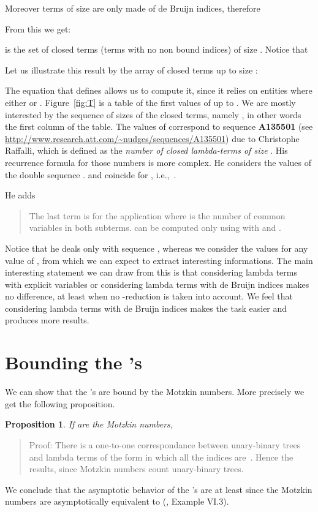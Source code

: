 \documentclass[preprint,authoryear]{elsarticle}
\newenvironment{proof}[1]{\begin{quotation}\noindent\textsf{Proof:} #1}{\end{quotation}}
\newtheorem{prop}{Proposition}
\newcommand{\ie}{i.e.,~}
\begin{document}
Moreover terms of size  are only made of de Bruijn
indices,  therefore 

From this we get:

 is the set of closed terms (terms with no non bound indices) of size .  Notice that  

Let us illustrate this result by the array of closed terms up to size :

\begin{footnotesize}
  
\end{footnotesize}
The equation that defines  allows us to compute it, since it relies on entities
 where either  or .  Figure~\ref{fig:T} is a table of the first values
of  up to .  We are mostly interested by the sequence of sizes of the
closed terms, namely , in other words the first column of the table.  The values
of  correspond to sequence \textbf{A135501} (see
\url{http://www.research.att.com/~nudges/sequences/A135501}) due to Christophe Raffalli,
which is defined as the \emph{number of closed lambda-terms of size }.  His recurrence formula for those
numbers is more complex.  He considers the values of the double sequence .
 and  coincide for , \ie .


He adds
\begin{sf}
  \begin{quote}
    The last term is for the application where  is the number of common variables in
    both subterms.   can be computed only using  with  and .
  \end{quote}
\end{sf}


Notice that he deals only with sequence , whereas we consider the values for any
value of , from which we can expect to extract interesting informations.  The main
interesting statement we can draw from this is that considering lambda terms with explicit
variables or considering lambda terms with de Bruijn indices makes no difference, at least
when no -reduction is taken into account.  We
feel that considering lambda terms with de Bruijn indices makes the task easier and
produces more results.

\section{Bounding the 's}
\label{sec:bounding-t_0-m}

We can show that the 's are bound by the Motzkin numbers.
More precisely we get the following proposition.
\begin{prop} 
If  are the Motzkin numbers,
  
\end{prop}
\begin{proof}{}
  There is a one-to-one correspondance between unary-binary trees and lambda terms of the
  form  in which all the indices are~.  Hence the results, since Motzkin
  numbers count unary-binary trees.
\end{proof}
We conclude that the asymptotic behavior of the 's are at least  since the
Motzkin numbers are asymptotically equivalent to 
(\cite{flajolet08:_analy_combin}, Example VI.3).  
\end{document}
